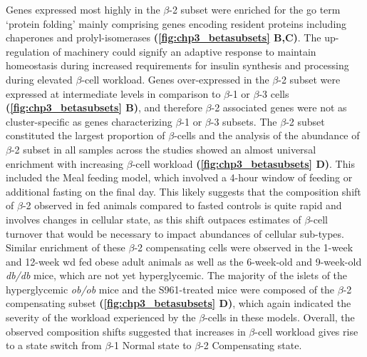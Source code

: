 \par Genes expressed most highly in the $\beta$-2 subset were enriched for the \gls{go} term `protein folding' mainly comprising genes encoding  resident proteins including chaperones and prolyl-isomerases \textbf{(\ref{fig:chp3_betasubsets} B,C)}. The up-regulation of  machinery could signify an adaptive response to maintain  homeostasis during increased requirements for insulin synthesis and processing during elevated $\beta$-cell workload. Genes over-expressed in the $\beta$-2 subset were expressed at intermediate levels in comparison to $\beta$-1 or $\beta$-3 cells \textbf{(\autoref{fig:chp3_betasubsets} B)}, and therefore $\beta$-2 associated genes were not as cluster-specific as genes characterizing $\beta$-1 or $\beta$-3 subsets. The $\beta$-2 subset constituted the largest proportion of $\beta$-cells and the analysis of the abundance of $\beta$-2 subset in all samples across the studies showed an almost universal enrichment with increasing $\beta$-cell workload \textbf{(\autoref{fig:chp3_betasubsets} D)}. This included the Meal feeding model, which involved a 4-hour window of feeding or additional fasting on the final day. This likely suggests that the composition shift of $\beta$-2 observed in fed animals compared to fasted controls is quite rapid and involves changes in cellular state, as this shift outpaces estimates of $\beta$-cell turnover that would be necessary to impact abundances of cellular sub-types. Similar enrichment of these $\beta$-2 compensating cells  were observed in the 1-week and 12-week \gls{wd} fed obese adult animals as well as the 6-week-old and 9-week-old \textit{db/db} mice, which are not yet hyperglycemic. The majority of the islets of the hyperglycemic \textit{ob/ob} mice and the S961-treated mice were composed of the $\beta$-2 compensating subset \textbf{(\autoref{fig:chp3_betasubsets} D)}, which again indicated the severity of the workload experienced by the $\beta$-cells in these models. Overall, the observed composition shifts suggested that increases in $\beta$-cell workload gives rise to a state switch from $\beta$-1 Normal state to $\beta$-2 Compensating state.\\

